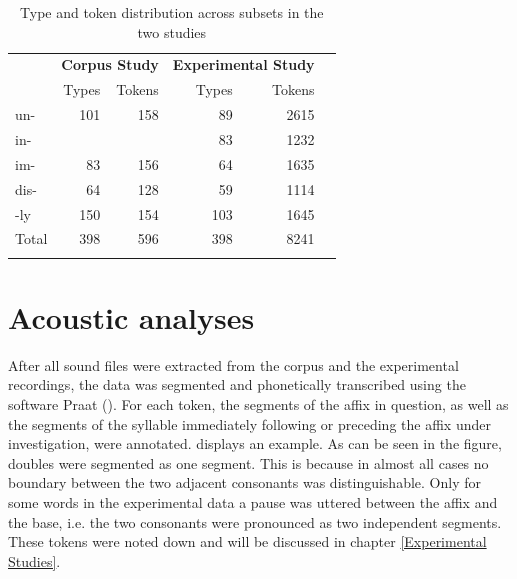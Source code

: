 \begin{table}
	\caption{Type and token distribution across subsets in the two studies}
	\label{tbl:token distribution both studies}
	
		\begin{tabular}{lrrrrr}
		\lsptoprule	
		&	\multicolumn{2}{r}{\textbf{Corpus Study} } &\multicolumn{2}{r}{\textbf{Experimental Study}} 
		\\ 

			& Types & Tokens & \hspace*{3cm} Types & Tokens \\
			\midrule
			{un-} \hspace*{1cm} & 101&158 &89 & 2615\\
			{in-}&&& 83 & 1232\\ 
			{im-}& 83 & 156 &  64&  1635\\ 
			{dis-} &64& 128 &59&1114  \\ 
			{-ly}& 150&  154 & 103& 1645 \\ 
			\midrule
			Total & 398 & 596& 398& 8241\\
			
			\lspbottomrule


		\end{tabular}
	
\end{table}









\section{Acoustic analyses}\label{Acoustic Analysis}
After all sound files were extracted from the corpus and the experimental recordings, the data was segmented and phonetically transcribed using the software Praat (\citealt{Boersma.2014}). For each token, the segments of the affix in question, as well as the segments of the syllable immediately following or preceding the affix under investigation, were annotated.  displays an example. As can be seen in the figure, doubles were segmented as one segment. This is because in almost all cases no boundary between the two adjacent consonants was distinguishable. Only for some words in the experimental data a pause was uttered between the affix and the base, i.e. the two consonants were pronounced as two independent segments. These tokens were noted down and will be discussed in chapter \ref{Experimental Studies}.

